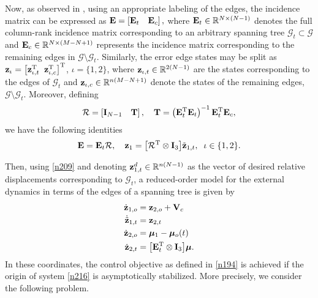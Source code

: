 Now, as observed in \cite{restrepo_edge-directed_2020}, using an appropriate labeling of the edges, the incidence matrix can be expressed as $\mathbf{E} = \left[\mathbf{E}_t\quad \mathbf{E}_c\right],$
where $\mathbf{E}_t\in\mathbb{R}^{N\times(N-1)}$ denotes the full column-rank incidence matrix corresponding to an arbitrary spanning tree $\mathcal G_t \subset \mathcal G$ and $\mathbf{E}_c \in \mathbb{R}^{N\times(M-N+1)}$ represents the incidence matrix corresponding to the remaining edges in $\mathcal G \setminus \mathcal G_t$.
Similarly, the error edge states may be split as $\mathbf{z}_\iota=\left[\mathbf{z}_{\iota, t}^{\mathrm{T}}\;\;\mathbf{z}_{\iota, c}^{\mathrm{T}}\right]^{\mathrm{T}}$, $\iota=\{1,2\}$, where $\mathbf{z}_{\iota, t}\in\mathbb{R}^{2(N-1)}$ are the states corresponding to the edges of $\mathcal G_t$ and $\mathbf{z}_{\iota, c} \in \mathbb{R}^{n(M-N+1)}$ denote the states of the remaining edges, $\mathcal G \setminus \mathcal G_t$.
Moreover, defining 
\begin{equation}\label{n205}
\mathcal{R} = \left[\mathbf{I}_{N-1}\quad \mathbf{T}\right], \quad \mathbf{T}=\left(\mathbf{E}_t^{\mathrm{T}} \mathbf{E}_t\right)^{-1}\mathbf{E}_t^{\mathrm{T}} \mathbf{E}_c,
\end{equation}
we have the following identities
\begin{equation}\label{n209}
\mathbf{E} = \mathbf{E}_t \mathcal{R}, \quad \mathbf{z}_1 = \big[\mathcal{R}^{\mathrm{T}}\otimes \mathbf{I}_3\big] \tilde{\mathbf{z}}_{1, t}, \;\; \iota\in\{1,2\}.
\end{equation}

Then, using \eqref{n209} and denoting $\mathbf{z}_{1, t}^d\in\mathbb{R}^{n(N-1)}$ as the vector of desired relative displacements corresponding to $\mathcal G_t$, a reduced-order model for the external dynamics in terms of the edges of a spanning tree is given by
\begin{subequations}\allowdisplaybreaks\label{n216}\begin{align}
	\dot{\mat{z}}_{1, o}&=\mat{z}_{2, o}+\ocean\label{n217-t}\\
	\dot{\tilde{\mat{z}}}_{1, t} &=\mat{z}_{2, t}\label{n217}\\
	\dot{\mat{z}}_{2, o}&=\bs{\mu}_1-\bs{\mu}_o(t)\label{n218-t}\\
	\dot{\mat{z}}_{2, t}&=\big[\mat{E}_t\T\otimes \mat{I}_3\big]\bs{\mu}.\label{n218}
	\end{align}\end{subequations}
In these coordinates, the control objective as defined in \eqref{n194} is achieved if the origin of system \eqref{n216} is asymptotically stabilized.
More precisely, we consider the following problem. 

